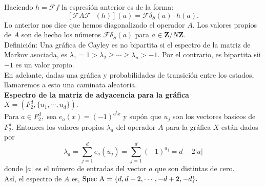 \documentclass[a4paper,openright,10pt]{article}
\begin{document}
Haciendo $h=\mathcal{F}f$ la espresi\'on anterior es de la forma: $$
[\mathcal{F}A \mathcal{F^{-}} (h)](a)=\mathcal{F}\delta_{S}(a)\cdot h(a).
$$ Lo anterior nos dice que hemos diagonalizado el operador $A.$ Los valores propios de $A$ son de hecho los n\'umeros $\mathcal{F}\delta_{S}(a)$ para $a\in \mathbf{Z}/N\mathbf{Z}.$\\
Definici\'on: Una gr\'afica de Cayley es no bipartita si el espectro de la matriz de Markov asociada, es $\lambda_{1}=1> \lambda_{2}\geq \cdots \geq \lambda_{n}>-1.$ Por el contrario, es bipartita sii $-1$ es un valor propio.\\ 
En adelante, dadas una gr\'afica y probabilidades de transici\'on entre los estados, llamaremos a esto una caminata aleatoria.\\

\textbf{Espectro de la matriz de adyacencia para la gr\'afica $\textit{X}=(\textit{F}_{2} ^{d}, \{u_{1},\cdots,u_{d}\}).$}\\
Para $a\in \textit{F}_{2} ^{d},$ sea $e_{a}(x)=(-1)^{a^{t}x}$ y sup\'on que $u_{j}$ son los vectores basicos de $\textit{F}_{2} ^{d}.$ Entonces los valores propios $\lambda_{a}$ del operador $A$ para la gráfica $\textit{X}$ est\'an dados por $$
\lambda_{a}=\sum\limits_{j=1}^{d}e_{a}(u_{j})=\sum\limits_{j=1}^{d}(-1)^{a_{j}}=d-2|a|
$$ donde $|a|$ es el n\'umero de entradas del vector $a$ que son distintas de cero.\\
As\'i, el espectro de $A$ es, $\textmd{Spec A}=\{d,d-2,\cdots, -d+2, -d\}.$\\
\end{document}
